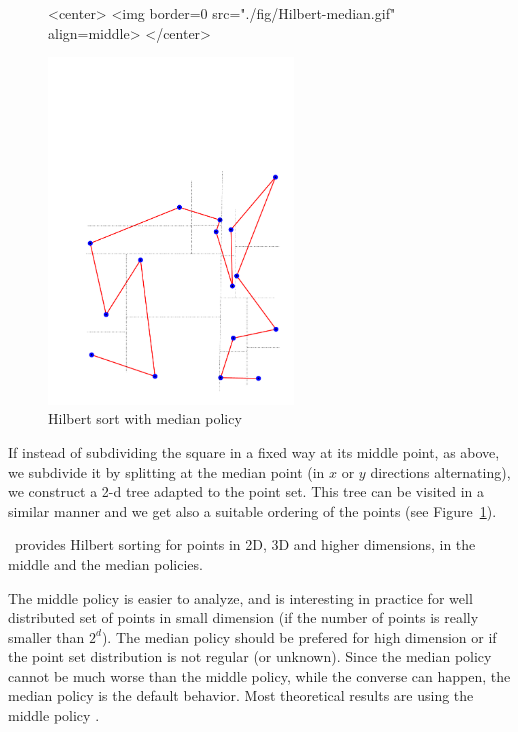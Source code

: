 \begin{figure}[t]
\begin{ccHtmlOnly}
<center>
<img border=0 src="./fig/Hilbert-median.gif" align=middle>
</center>
\end{ccHtmlOnly} 
\begin{ccTexOnly}
\begin{center}
\includegraphics[width=6.5cm]{Spatial_sorting/fig/Hilbert-median}
\end{center}
\end{ccTexOnly}
\caption{Hilbert sort with median policy
\label{Spatial_sorting_fig_Hilbert_median}}
\end{figure}

If instead of subdividing the square in a fixed way at its middle point,
 as above, we subdivide it
by splitting at the median point (in $x$ or $y$ directions alternating),
we construct a 2-d tree adapted to the point set. This tree can be visited in a
similar manner and we get also a suitable ordering of the points
(see Figure~\ref{Spatial_sorting_fig_Hilbert_median}).






\cgal\ provides Hilbert sorting for points in 2D, 3D and higher dimensions,
in the middle and the median policies.

The middle policy is easier to analyze, and is interesting in practice
for well distributed set of points in small dimension (if the number
of points is really smaller than $2^d$).
The median policy should be prefered for high dimension or if 
the point set distribution is not regular (or unknown).
Since the median policy cannot be much worse than the middle
policy, while the converse can happen, the median policy is the
default behavior.
Most theoretical results are using the middle policy
\cite{acr-icb-03,b-aahsf-71,bg-sfche-89,pb-scpts-89}.


